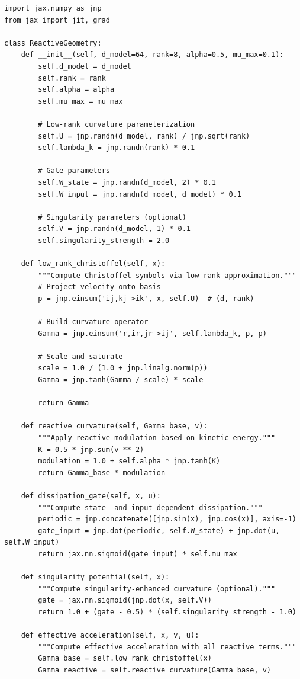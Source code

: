 \documentclass[12pt,letterpaper,twoside]{article}
\begin{document}
\begin{verbatim}
import jax.numpy as jnp
from jax import jit, grad

class ReactiveGeometry:
    def __init__(self, d_model=64, rank=8, alpha=0.5, mu_max=0.1):
        self.d_model = d_model
        self.rank = rank
        self.alpha = alpha
        self.mu_max = mu_max
        
        # Low-rank curvature parameterization
        self.U = jnp.randn(d_model, rank) / jnp.sqrt(rank)
        self.lambda_k = jnp.randn(rank) * 0.1
        
        # Gate parameters
        self.W_state = jnp.randn(d_model, 2) * 0.1
        self.W_input = jnp.randn(d_model, d_model) * 0.1
        
        # Singularity parameters (optional)
        self.V = jnp.randn(d_model, 1) * 0.1
        self.singularity_strength = 2.0
        
    def low_rank_christoffel(self, x):
        """Compute Christoffel symbols via low-rank approximation."""
        # Project velocity onto basis
        p = jnp.einsum('ij,kj->ik', x, self.U)  # (d, rank)
        
        # Build curvature operator
        Gamma = jnp.einsum('r,ir,jr->ij', self.lambda_k, p, p)
        
        # Scale and saturate
        scale = 1.0 / (1.0 + jnp.linalg.norm(p))
        Gamma = jnp.tanh(Gamma / scale) * scale
        
        return Gamma
    
    def reactive_curvature(self, Gamma_base, v):
        """Apply reactive modulation based on kinetic energy."""
        K = 0.5 * jnp.sum(v ** 2)
        modulation = 1.0 + self.alpha * jnp.tanh(K)
        return Gamma_base * modulation
    
    def dissipation_gate(self, x, u):
        """Compute state- and input-dependent dissipation."""
        periodic = jnp.concatenate([jnp.sin(x), jnp.cos(x)], axis=-1)
        gate_input = jnp.dot(periodic, self.W_state) + jnp.dot(u, self.W_input)
        return jax.nn.sigmoid(gate_input) * self.mu_max
    
    def singularity_potential(self, x):
        """Compute singularity-enhanced curvature (optional)."""
        gate = jax.nn.sigmoid(jnp.dot(x, self.V))
        return 1.0 + (gate - 0.5) * (self.singularity_strength - 1.0)
    
    def effective_acceleration(self, x, v, u):
        """Compute effective acceleration with all reactive terms."""
        Gamma_base = self.low_rank_christoffel(x)
        Gamma_reactive = self.reactive_curvature(Gamma_base, v)
        

\end{verbatim}
\end{document}
